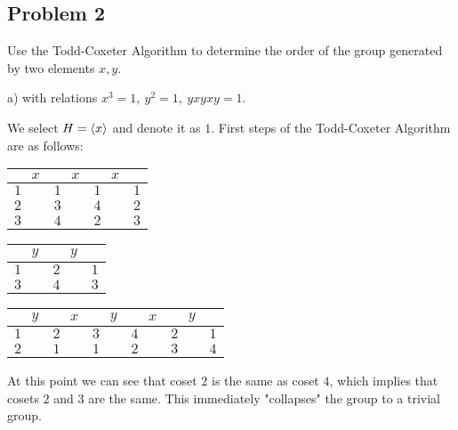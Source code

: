\documentclass{article}
\theoremstyle{definition}
\DeclarePairedDelimiter\genby{\langle}{\rangle}
\begin{document}
\subsection*{Problem 2}

\begin{tcolorbox}
Use the Todd-Coxeter Algorithm to determine the order of the group generated by two elements $x, y$.

a) with relations $x^3 = 1, \> y^2 = 1, \> yxyxy = 1$.
\end{tcolorbox}

We select $H = \genby{x}$ and denote it as $1$.
First steps of the Todd-Coxeter Algorithm are as follows:

\begin{center}
    \begin{tabular}{l l l l} 
        \hline
        $\quad \> x$ & $\quad \> x$ & $\quad \> x$ \\
        \hline
        $1$ & $1$ & $1$ & $1$ \\ 
        $2$ & $3$ & $4$ & $2$ \\ 
        $3$ & $4$ & $2$ & $3$ 
        \\\hline
    \end{tabular}
\end{center}

\begin{center}
    \begin{tabular}{l l l} 
        \hline
        $\quad \> y$ & $\quad \> y$\\
        \hline
        $1$ & $2$ & $1$ \\ 
        $3$ & $4$ & $3$
        \\\hline
    \end{tabular}
\end{center}

\begin{center}
    \begin{tabular}{l l l l l l} 
        \hline
        $\quad \> y$ & $\quad \> x$ & $\quad \> y$ & $\quad \> x$ & $\quad \> y$ \\
        \hline
        $1$ & $2$ & $3$ & $4$ & $2$ & $1$ \\ 
        $2$ & $1$ & $1$ & $2$ & $3$ & $4$
        \\\hline
    \end{tabular}
\end{center}

At this point we can see that coset $2$ is the same as coset $4$, which implies that cosets $2$ and $3$ are the same.
This immediately "collapses" the group to a trivial group.
\end{document}
